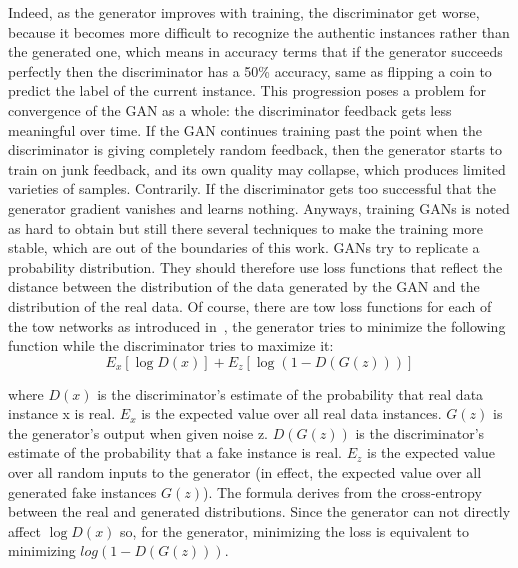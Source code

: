 Indeed, as the generator improves with training, the discriminator get worse, because it becomes more difficult to recognize the authentic instances rather than the generated one, which means in accuracy terms that if the generator succeeds perfectly then the discriminator has a 50\% accuracy, same as flipping a coin to predict the label of the current instance.
This progression poses a problem for convergence of the GAN as a whole: the discriminator feedback gets less meaningful over time. If the GAN continues training past the point when the discriminator is giving completely random feedback, then the generator starts to train on junk feedback, and its own quality may collapse, which produces limited varieties of samples. Contrarily. If the discriminator gets too successful that the generator gradient vanishes and learns nothing.
Anyways, training GANs is noted as hard to obtain but still there several techniques to make the training more stable, which are out of the boundaries of this work. GANs try to replicate a probability distribution. They should therefore use loss functions that reflect the distance between the distribution of the data generated by the GAN and the distribution of the real data. Of course, there are tow loss functions for each of the tow networks as introduced in~\cite{goodfellow2014generative}, the generator tries to minimize the following function while the discriminator tries to maximize it:
\begin{equation}
E_x[\log{D(x)}] + E_z[\log{(1-D(G(z)))}]
\label{eq:GAN_loss}
\end{equation}

where $D(x)$ is the discriminator's estimate of the probability that real data instance x is real.
$E_x$ is the expected value over all real data instances. $G(z)$ is the generator's output when given noise z. $D(G(z))$ is the discriminator's estimate of the probability that a fake instance is real.
$E_z$ is the expected value over all random inputs to the generator (in effect, the expected value over all generated fake instances $G(z)$). The formula derives from the cross-entropy between the real and generated distributions. Since the generator can not directly affect $\log{D(x)}$ so, for the generator, minimizing the loss is equivalent to minimizing $log(1 - D(G(z)))$.


\clearpage{\pagestyle{empty}\cleardoublepage}